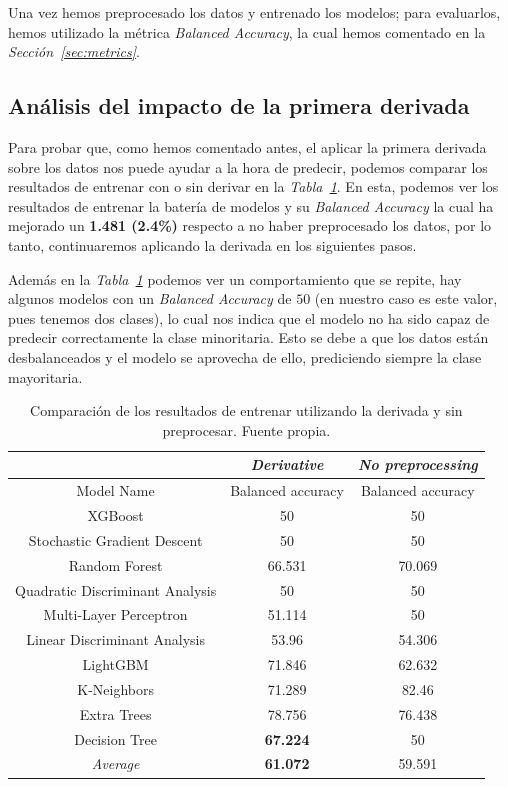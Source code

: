 Una vez hemos preprocesado los datos y entrenado los modelos; para evaluarlos, hemos utilizado la métrica \textit{Balanced Accuracy}, la cual hemos comentado en la \textit{Sección\ \ref{sec:metrics}}.

\subsection{Análisis del impacto de la primera derivada}

Para probar que, como hemos comentado antes, el aplicar la primera derivada sobre los datos nos puede ayudar a la hora de predecir, podemos comparar los resultados de entrenar con o sin derivar en la \textit{Tabla\ \ref{tab:nopreprocessing-derivative-results}}. En esta, podemos ver los resultados de entrenar la batería de modelos y su \textit{Balanced Accuracy} la cual ha mejorado un \textbf{1.481 (2.4\%)} respecto a no haber preprocesado los datos, por lo tanto, continuaremos aplicando la derivada en los siguientes pasos.

Además en la \textit{Tabla\ \ref{tab:nopreprocessing-derivative-results}} podemos ver un comportamiento que se repite, hay algunos modelos con un \textit{Balanced Accuracy} de $50$ (en nuestro caso es este valor, pues tenemos dos clases), lo cual nos indica que el modelo no ha sido capaz de predecir correctamente la clase minoritaria. Esto se debe a que los datos están desbalanceados y el modelo se aprovecha de ello, prediciendo siempre la clase mayoritaria.


\begin{table}[!ht]
    \centering
    \begin{tabular}{|c|c|c|}
        \hline
        & \textit{Derivative} & \textit{No preprocessing} \\ \hline
        Model Name & Balanced accuracy & Balanced accuracy \\ \hline
        XGBoost & 50 & 50 \\ 
        Stochastic Gradient Descent & 50 & 50 \\ 
        Random Forest & 66.531 & 70.069 \\ 
        Quadratic Discriminant Analysis & 50 & 50 \\ 
        Multi-Layer Perceptron & 51.114 & 50 \\ 
        Linear Discriminant Analysis & 53.96 & 54.306 \\ 
        LightGBM & 71.846 & 62.632 \\ 
        K-Neighbors & 71.289 & 82.46 \\ 
        Extra Trees & 78.756 & 76.438 \\ 
        Decision Tree & \textbf{67.224} & 50 \\ \hline
        \textit{Average} & \textbf{61.072} & 59.591 \\ \hline
    \end{tabular}
    \caption{Comparación de los resultados de entrenar utilizando la derivada y sin preprocesar. Fuente propia.}\ \label{tab:nopreprocessing-derivative-results}
\end{table}


